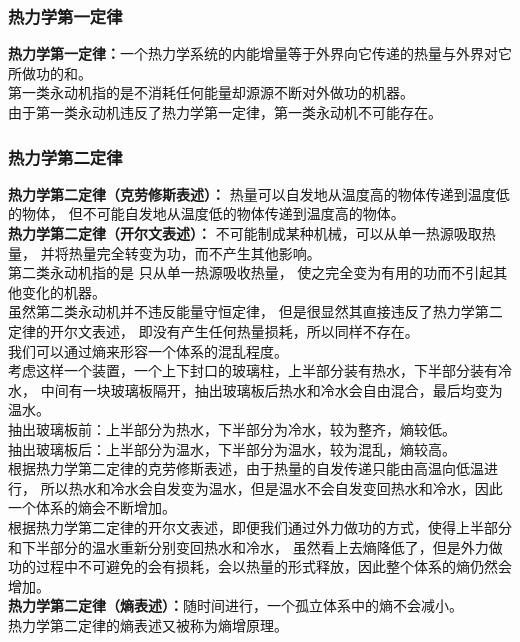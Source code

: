 \documentclass[UTF8]{ctexart}
\begin{document}
\subsubsection{热力学第一定律}
    \textbf{热力学第一定律：}一个热力学系统的内能增量等于外界向它传递的热量与外界对它所做功的和。\\[4mm]
    第一类永动机指的是不消耗任何能量却源源不断对外做功的机器。\\[2mm]
    由于第一类永动机违反了热力学第一定律，第一类永动机不可能存在。

\subsubsection{热力学第二定律}
    \textbf{热力学第二定律（克劳修斯表述）：}
    热量可以自发地从温度高的物体传递到温度低的物体，
    但不可能自发地从温度低的物体传递到温度高的物体。\\[3mm]
    \textbf{热力学第二定律（开尔文表述）：}
    不可能制成某种机械，可以从单一热源吸取热量，
    并将热量完全转变为功，而不产生其他影响。\\[4mm]
    第二类永动机指的是
    只从单一热源吸收热量，
    使之完全变为有用的功而不引起其他变化的机器。\\[2mm]
    虽然第二类永动机并不违反能量守恒定律，
    但是很显然其直接违反了热力学第二定律的开尔文表述，
    即没有产生任何热量损耗，所以同样不存在。\\[5mm]
    我们可以通过熵来形容一个体系的混乱程度。\\[3mm]
    考虑这样一个装置，一个上下封口的玻璃柱，上半部分装有热水，下半部分装有冷水，
    中间有一块玻璃板隔开，抽出玻璃板后热水和冷水会自由混合，最后均变为温水。\\[3mm]
    抽出玻璃板前：上半部分为热水，下半部分为冷水，较为整齐，熵较低。\\[2mm]
    抽出玻璃板后：上半部分为温水，下半部分为温水，较为混乱，熵较高。\\[3mm]
    根据热力学第二定律的克劳修斯表述，由于热量的自发传递只能由高温向低温进行，
    所以热水和冷水会自发变为温水，但是温水不会自发变回热水和冷水，因此一个体系的熵会不断增加。\\[3mm]
    根据热力学第二定律的开尔文表述，即便我们通过外力做功的方式，使得上半部分和下半部分的温水重新分别变回热水和冷水，
    虽然看上去熵降低了，但是外力做功的过程中不可避免的会有损耗，会以热量的形式释放，因此整个体系的熵仍然会增加。\\[3mm]
    \textbf{热力学第二定律（熵表述）：}随时间进行，一个孤立体系中的熵不会减小。\\[3mm]
    热力学第二定律的熵表述又被称为熵增原理。\vspace{5pt}
\end{document}
